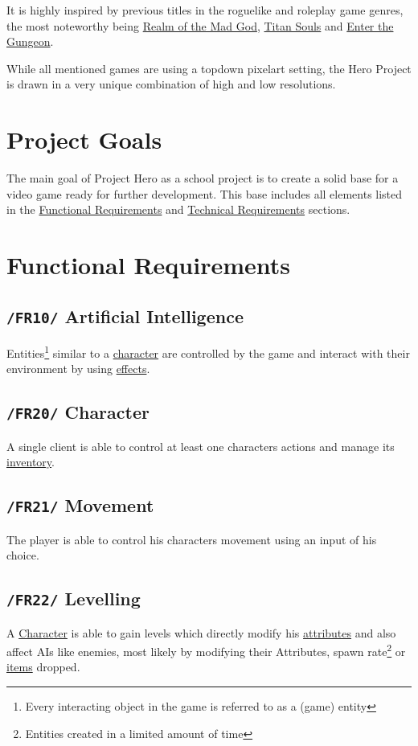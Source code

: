 \documentclass[11pt]{article}
\begin{document}
It is highly inspired by previous titles in the roguelike and roleplay game genres, the most noteworthy being \href{https://realmofthemadgod.com}{Realm of the Mad God}, \href{http://www.devolverdigital.com/games/view/titan-souls}{Titan Souls} and \href{http://dodgeroll.com/gungeon/}{Enter the Gungeon}.

While all mentioned games are using a topdown pixelart setting, the Hero Project is drawn in a very unique combination of high and low resolutions.

\section{Project Goals}
The main goal of Project Hero as a school project is to create a solid base for a video game ready for further development.
This base includes all elements listed in the \hyperref[sec:fr]{Functional Requirements} and \hyperref[sec:tr]{Technical Requirements} sections.

\newpage

\section{Functional Requirements}\label{sec:fr}
\subsection{\texttt{/FR10/} Artificial Intelligence}\label{subsec:fr10ai}
Entities\footnote{Every interacting object in the game is referred to as a (game) entity} similar to a \hyperref[subsec:fr20character]{character} are controlled by the game and interact with their environment by using \hyperref[subsec:fr30effects]{effects}.
\subsection{\texttt{/FR20/} Character}\label{subsec:fr20character}
A single client is able to control at least one characters actions and manage its \hyperref[subsec:fr41inventory]{inventory}.
\subsection{\texttt{/FR21/} Movement}\label{subsec:fr21movement}
The player is able to control his characters movement using an input of his choice.
\subsection{\texttt{/FR22/} Levelling}\label{subsec:fr22levelling}
A \hyperref[subsec:fr20character]{Character} is able to gain levels which directly modify his \hyperref[subsec:fr50attributes]{attributes} and also affect AIs like enemies, most likely by modifying their Attributes, spawn rate\footnote{Entities created in a limited amount of time} or \hyperref[subsec:fr40items]{items} dropped.
\end{document}
